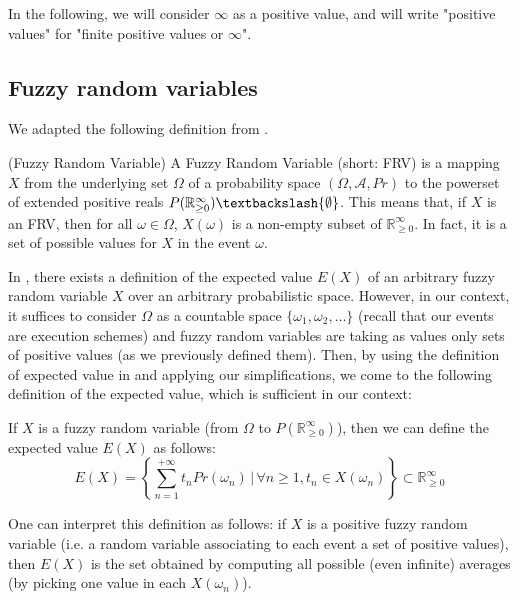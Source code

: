 \documentclass[a4paper,10pt]{llncs}
\def\RRposi {{\mathbb R_{\geq 0}^{\infty}}}
\begin{document}
\begin{remark}
In the following, we will consider $\infty$ as a positive value, and will write "positive values" for "finite positive values or $\infty$".
\end{remark}

\subsection{Fuzzy random variables}
We adapted the following definition from \cite{PuriRal86}.

\begin{definition}{\textnormal{(Fuzzy Random Variable)\newline}}
 A Fuzzy Random Variable (short: FRV) is a mapping $X$ from the underlying set $\Omega$ of a probability space $(\Omega,\mathcal{A},Pr)$ to the powerset of extended positive reals $P(\RRposi)\textbackslash\{\emptyset\}$. This means that, if $X$ is an FRV, then for all $\omega \in \Omega$, $X(\omega)$ is a non-empty subset of $\RRposi$. In fact, it is a set of possible values for $X$ in the event $\omega$.
\end{definition}

In \cite{PuriRal86}, there exists a definition of the expected value $E(X)$ of an arbitrary fuzzy random variable $X$ over an arbitrary probabilistic space. However, in our context, it suffices to consider $\Omega$ as a countable space $\{\omega_1, \omega_2, \dots \}$ (recall that our events are execution schemes) and fuzzy random variables are taking as values only sets of positive values (as we previously defined them). Then, by using the definition of expected value in \cite{PuriRal86} and applying our simplifications, we come to the following definition of the expected value, which is sufficient in our context:

\begin{definition}
If $X$ is a fuzzy random variable (from $\Omega$ to $P(\RRposi)$), then we can define the expected value $E(X)$ as follows:
$$E(X) = \left\{ \sum_{n = 1}^{+\infty} t_nPr(\omega_n) \,|\, \forall n \geq 1, t_n \in X(\omega_n) \right\} \subset \RRposi$$
\end{definition}
One can interpret this definition as follows: if $X$ is a positive fuzzy random variable (i.e. a random variable associating to each event a set of positive values), then $E(X)$ is the set obtained by computing all possible (even infinite) averages (by picking one value in each $X(\omega_n)$).
\end{document}
